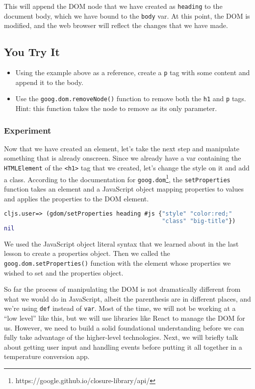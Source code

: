\documentclass[10pt,twoside,openright]{memoir}
\begin{document}
This will append the DOM node that we have created as \texttt{heading}
to the document body, which we have bound to the \texttt{body} var. At
this point, the DOM is modified, and the web browser will reflect the
changes that we have made.

\subsection{You Try It}

\begin{itemize}
\tightlist
\item
  Using the example above as a reference, create a \texttt{p} tag with
  some content and append it to the body.
\item
  Use the \texttt{goog.dom.removeNode()} function to remove both the
  \texttt{h1} and \texttt{p} tags. Hint: this function takes the node to
  remove as its only parameter.
\end{itemize}

\subsubsection{Experiment}

Now that we have created an element, let's take the next step and
manipulate something that is already onscreen. Since we already have a
var containing the \texttt{HTMLElement} of the
\texttt{\textless{}h1\textgreater{}} tag that we created, let's change
the style on it and add a class. According to
the documentation
for \texttt{goog.dom}\footnote{https://google.github.io/closure-library/api/}, the \texttt{setProperties} function takes an
element and a JavaScript object mapping properties to values and applies
the properties to the DOM element.

\begin{lstlisting}[language=Clojure]
cljs.user=> (gdom/setProperties heading #js {"style" "color:red;"
                                             "class" "big-title"})
nil
\end{lstlisting}

We used the JavaScript object literal syntax that we learned about in
the last lesson to create a properties object. Then we called the
\texttt{goog.dom.setProperties()} function with the element whose
properties we wished to set and the properties object.

So far the process of manipulating the DOM is not dramatically different
from what we would do in JavaScript, albeit the parenthesis are in
different places, and we're using \texttt{def} instead of \texttt{var}.
Most of the time, we will not be working at a ``low level'' like this,
but we will use libraries like React to manage the DOM for us. However,
we need to build a solid foundational understanding before we can fully
take advantage of the higher-level technologies. Next, we will briefly
talk about getting user input and handling events before putting it all
together in a temperature conversion app.
\end{document}

